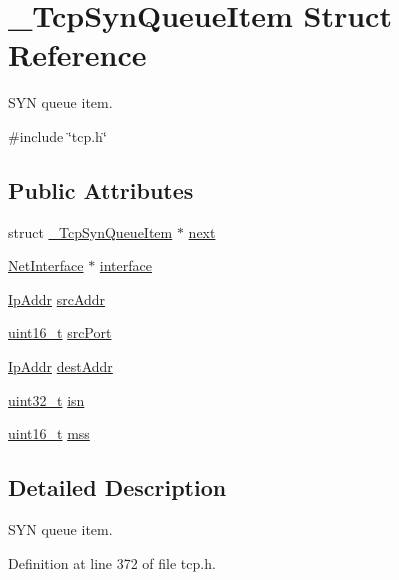 \hypertarget{struct__TcpSynQueueItem}{}\section{\+\_\+\+Tcp\+Syn\+Queue\+Item Struct Reference}
\label{struct__TcpSynQueueItem}


S\+YN queue item.  




{\ttfamily \#include \char`\"{}tcp.\+h\char`\"{}}

\subsection*{Public Attributes}
\begin{DoxyCompactItemize}
\item 
struct \hyperlink{struct__TcpSynQueueItem}{\+\_\+\+Tcp\+Syn\+Queue\+Item} $\ast$ \hyperlink{struct__TcpSynQueueItem_aec234d81bcfbfba730e21c3affa37848}{next}
\item 
\hyperlink{net_8h_a2234db8911a1148c9159979d8f5e0d6b}{Net\+Interface} $\ast$ \hyperlink{struct__TcpSynQueueItem_a547cb108888dc5c24d68f917429f0c94}{interface}
\item 
\hyperlink{structIpAddr}{Ip\+Addr} \hyperlink{struct__TcpSynQueueItem_a6a25919b9ea8c17c7e85fcacfa52f6a1}{src\+Addr}
\item 
\hyperlink{stdint_8h_a273cf69d639a59973b6019625df33e30}{uint16\+\_\+t} \hyperlink{struct__TcpSynQueueItem_ab6f9b3ec9b271f14661b6c6d18fb3066}{src\+Port}
\item 
\hyperlink{structIpAddr}{Ip\+Addr} \hyperlink{struct__TcpSynQueueItem_a6187af43e120966851c614da06753e2c}{dest\+Addr}
\item 
\hyperlink{stdint_8h_a435d1572bf3f880d55459d9805097f62}{uint32\+\_\+t} \hyperlink{struct__TcpSynQueueItem_a9b4eaa2fcb2b66297f2b4439ecacbd24}{isn}
\item 
\hyperlink{stdint_8h_a273cf69d639a59973b6019625df33e30}{uint16\+\_\+t} \hyperlink{struct__TcpSynQueueItem_a51c3ba7f08a857f3afcf7a4d4432825e}{mss}
\end{DoxyCompactItemize}


\subsection{Detailed Description}
S\+YN queue item. 

Definition at line 372 of file tcp.\+h.




